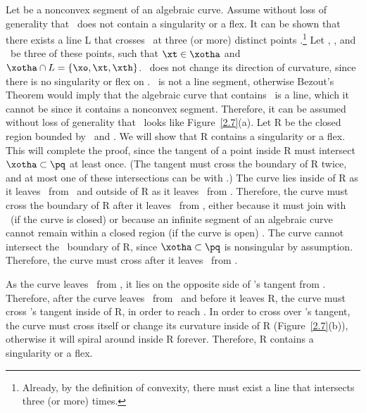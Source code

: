 Let  be a nonconvex segment of an algebraic curve.
Assume without loss of generality that \pq\ does not contain a singularity or 
a flex.
It can be shown that there exists a line L that crosses \pq\ at three 
(or more) distinct points \cite[p. 117]{jj}.\footnote{Already, by the definition
	of convexity, there must exist a line that intersects  three
	(or more) times.}
Let \xo, \xt, and \xth\ be three of these points, such that $\xt \in \xotha$ 
and \mbox{$\xotha \cap L = \{ \xo,\xt,\xth\}$}.
\xotha\ does not change its direction of curvature, since there is no 
singularity or flex on \pq.
\xotha\ is not a line segment, otherwise Bezout's Theorem would imply that
the algebraic curve that contains \xotha\ is a line, which it cannot be since
it contains a nonconvex segment.
Therefore, it can be assumed without loss of generality that \xotha\ looks like 
Figure~\ref{2.7}(a).
Let R be the closed region bounded by \xotha\ and \seg{\xo\xth}.
We will show that R contains a singularity or a flex.
This will complete the proof, since the tangent
of a point inside R must intersect $\xotha \subset \pq$ at least once.
(The tangent must cross the boundary of R twice, and at most one of these
intersections can be with 
\seg{\xo\xth}.)
The curve lies inside of R as it leaves \xotha\ from \xo\ and outside 
of R as it leaves \xotha\ from \xth.
Therefore, the curve must cross the boundary of R after it leaves \xotha\
from \xo, either because it must join with \xth\ (if the curve is closed)
or because an infinite segment of an algebraic curve
cannot remain within a closed region (if the curve is open) \cite{jj}.
The curve cannot intersect the \xotha\ boundary of R, since
\mbox{$\xotha \subset \pq$} is nonsingular by assumption.
Therefore, the curve must cross \seg{\xo\xth} after it leaves
\xotha\ from \xo.

As the curve leaves \xotha\ from \xo,
it lies on the opposite side of \xo's tangent from \seg{\xo\xth}.
Therefore, after the curve leaves \xotha\ from \xo\ and before it leaves
R, the curve must cross \xo's tangent inside of R, in order to reach 
\seg{\xo\xth}.
In order to cross over \xo's tangent, the curve
must cross itself or change its curvature inside of R (Figure~\ref{2.7}(b)),
otherwise it will spiral around inside R forever.
Therefore, R contains a singularity or a flex.
\QED
%
%
%
\else
{}

